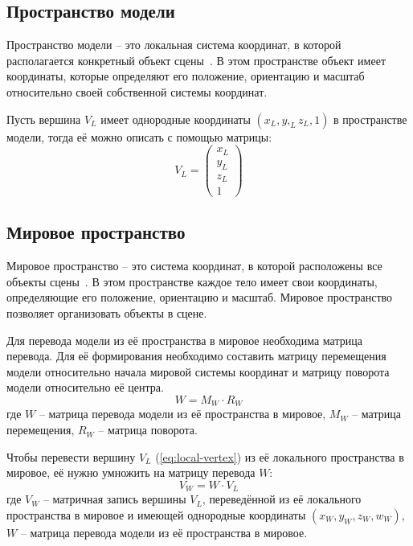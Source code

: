 \subsection{Пространство модели}

Пространство модели -- это локальная система координат, в которой располагается конкретный объект сцены~\cite{lit14}. В этом пространстве объект имеет координаты, которые определяют его положение, ориентацию и масштаб относительно своей собственной системы координат. 

Пусть вершина $V_L$ имеет однородные координаты $(x_L, y,_L z_L, 1)$ в пространстве модели, тогда её можно описать с помощью матрицы:
\begin{equation}
	V_L = 
	\begin{pmatrix}
		x_L \\
		y_L \\
		z_L \\
		1
	\end{pmatrix}
	\label{eq:local-vertex}
\end{equation}

\subsection{Мировое пространство}

Мировое пространство -- это система координат, в которой расположены все объекты сцены~\cite{lit14}. В этом пространстве каждое тело имеет свои координаты, определяющие его положение, ориентацию и масштаб. Мировое пространство позволяет организовать объекты в сцене.

Для перевода модели из её пространства в мировое необходима матрица перевода. Для её формирования необходимо составить матрицу перемещения модели относительно начала мировой системы координат и матрицу поворота модели относительно её центра.
\begin{equation}
	W = M_W \cdot R_W
\end{equation}
где $W$ -- матрица перевода модели из её пространства в мировое, $M_W$ -- матрица перемещения, $R_W$ -- матрица поворота.

Чтобы перевести вершину $V_L$ (\ref{eq:local-vertex}) из её локального пространства в мировое, её нужно умножить на матрицу перевода $W$:
\begin{equation}
	V_W = W \cdot V_L
	\label{eq:world-vertex}
\end{equation}
где $V_W$ -- матричная запись вершины $V_L$, переведённой из её локального пространства в мировое и имеющей однородные координаты $(x_W, y_W, z_W, w_W)$, $W$ -- матрица перевода модели из её пространства в мировое.

